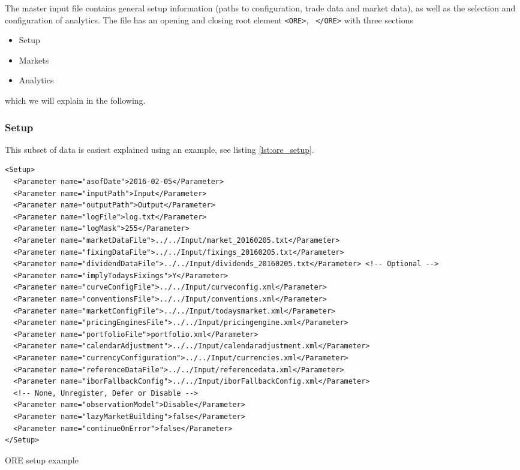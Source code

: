 \documentclass[12pt, a4paper]{article}
\begin{document}
{The master input file contains general setup information (paths to configuration, trade data and market data), as well
as the selection and configuration of analytics. The file has an opening and closing root element {\tt <ORE>}, {\tt
  </ORE>} with three sections
\begin{itemize}
\item Setup
\item Markets
\item Analytics
\end{itemize}
which we will explain in the following.

\subsubsection{Setup}

This subset of data is easiest explained using an example, see listing \ref{lst:ore_setup}.
\begin{listing}[H]
\begin{verbatim}
<Setup>
  <Parameter name="asofDate">2016-02-05</Parameter>
  <Parameter name="inputPath">Input</Parameter>
  <Parameter name="outputPath">Output</Parameter>
  <Parameter name="logFile">log.txt</Parameter>
  <Parameter name="logMask">255</Parameter>
  <Parameter name="marketDataFile">../../Input/market_20160205.txt</Parameter>
  <Parameter name="fixingDataFile">../../Input/fixings_20160205.txt</Parameter>
  <Parameter name="dividendDataFile">../../Input/dividends_20160205.txt</Parameter> <!-- Optional -->
  <Parameter name="implyTodaysFixings">Y</Parameter>
  <Parameter name="curveConfigFile">../../Input/curveconfig.xml</Parameter>
  <Parameter name="conventionsFile">../../Input/conventions.xml</Parameter>
  <Parameter name="marketConfigFile">../../Input/todaysmarket.xml</Parameter>
  <Parameter name="pricingEnginesFile">../../Input/pricingengine.xml</Parameter>
  <Parameter name="portfolioFile">portfolio.xml</Parameter>
  <Parameter name="calendarAdjustment">../../Input/calendaradjustment.xml</Parameter>
  <Parameter name="currencyConfiguration">../../Input/currencies.xml</Parameter>
  <Parameter name="referenceDataFile">../../Input/referencedata.xml</Parameter>
  <Parameter name="iborFallbackConfig">../../Input/iborFallbackConfig.xml</Parameter>
  <!-- None, Unregister, Defer or Disable -->
  <Parameter name="observationModel">Disable</Parameter>
  <Parameter name="lazyMarketBuilding">false</Parameter>
  <Parameter name="continueOnError">false</Parameter>
</Setup>
\end{verbatim}
\caption{ORE setup example}
\label{lst:ore_setup}
\end{listing}

}
\end{document}
